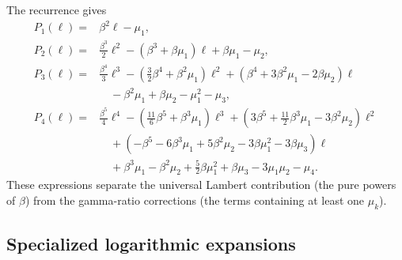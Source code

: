 \documentclass[11pt,a4paper]{article}
\theoremstyle{clean}
\theoremstyle{definition}
\newcommand{\be}{\beta}
\begin{document}
The recurrence gives
\begin{align}
 P_1(\ell)={}&\be^2\ell-\mu_1,
 \label{eq:P1-general}\\
 P_2(\ell)={}&\frac{\be^3}{2}\ell^2
 -(\be^3+\be\mu_1)\ell
 +\be\mu_1-\mu_2,
 \label{eq:P2-general}\\
 P_3(\ell)={}&\frac{\be^4}{3}\ell^3
 -\left(\frac32\be^4+\be^2\mu_1\right)\ell^2
 +\left(\be^4+3\be^2\mu_1-2\be\mu_2\right)\ell
 \nonumber\\
 &\quad-\be^2\mu_1+\be\mu_2-\mu_1^2-\mu_3,
 \label{eq:P3-general}\\
 P_4(\ell)={}&\frac{\be^5}{4}\ell^4
 -\left(\frac{11}{6}\be^5+\be^3\mu_1\right)\ell^3
 +\left(3\be^5+\frac{11}{2}\be^3\mu_1-3\be^2\mu_2\right)\ell^2
 \nonumber\\
 &\quad+\left(-\be^5-6\be^3\mu_1+5\be^2\mu_2
 -3\be\mu_1^2-3\be\mu_3\right)\ell
 \nonumber\\
 &\quad+\be^3\mu_1-\be^2\mu_2+\frac52\be\mu_1^2
 +\be\mu_3-3\mu_1\mu_2-\mu_4.
 \label{eq:P4-general}
\end{align}
These expressions separate the universal Lambert contribution (the pure powers of \(\be\)) from the gamma-ratio corrections (the terms containing at least one \(\mu_k\)).

\subsection{Specialized logarithmic expansions}
\end{document}
